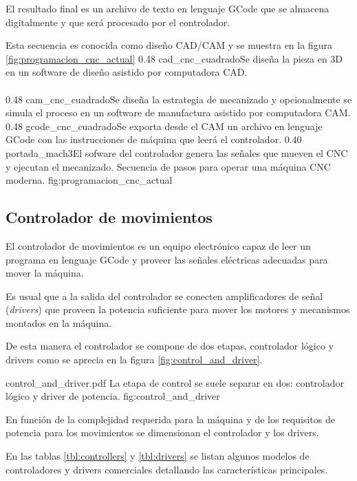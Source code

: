    El resultado final es un archivo de texto en lenguaje GCode que se almacena digitalmente y que será procesado por el controlador.\par
          Esta secuencia es conocida como diseño CAD/CAM y se muestra en la figura \ref{fig:programacion_cnc_actual}
\subfigtwotwo 
            {0.48 }{cad_cnc_cuadrado}{Se diseña la pieza en 3D en un software de diseño asistido por computadora CAD.\\ \vphantom{1}\\ \vphantom{1}}
            {0.48 }{cam_cnc_cuadrado}{Se diseña la estrategia de mecanizado y opcionalmente se simula el proceso en un software de manufactura asistido por computadora CAM.}
            {0.48 }{gcode_cnc_cuadrado}{Se exporta desde el CAM un archivo en lenguaje GCode con las instrucciones de máquina que leerá el controlador.}
            {0.40 }{portada_mach3}{El sofware del controlador genera las señales que mueven el CNC y ejecutan el mecanizado.}
            {Secuencia de pasos para operar una máquina CNC moderna.}
            {fig:programacion_cnc_actual}

\subsection{Controlador de movimientos}
El controlador de movimientos es un equipo electrónico capaz de leer un programa en lenguaje GCode y proveer las señales eléctricas adecuadas para mover la máquina.\par
Es usual que a la salida del controlador se conecten amplificadores de señal (\textit{drivers}) que proveen la potencia suficiente para mover los motores y mecanismos montados en la máquina.\par
De esta manera el controlador se compone de dos etapas, controlador lógico y drivers como se aprecia en la figura \ref{fig:control_and_driver}.

         {control_and_driver.pdf}
         {La etapa de control se suele separar en dos: controlador lógico y driver de potencia.}
         {fig:control_and_driver}

En función de la complejidad requerida para la máquina y de los requisitos de potencia para los movimientos se dimensionan el controlador y los drivers.\par
En las tablas \ref{tbl:controllers} y \ref{tbl:drivers} se listan algunos modelos de controladores y drivers comerciales detallando las características principales.


